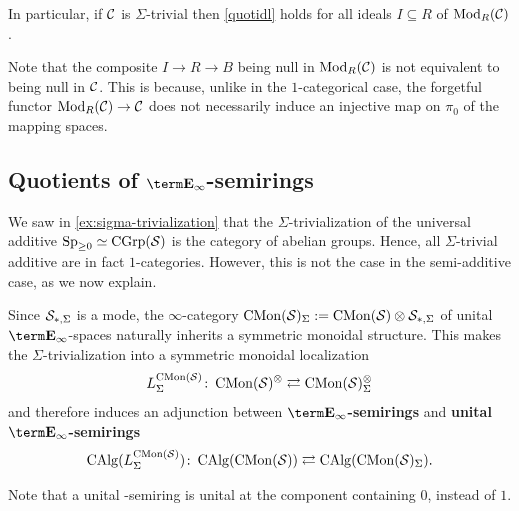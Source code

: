 \documentclass[10pt,a4paper,oneside]{article}
\begin{document}
\begin{rem}
In particular, if $\mathcal{C}$ is $\Sigma$-trivial then \cref{quotidl} holds for all ideals $I \subseteq R$ of $\operatorname{Mod}_{R}(\mathcal{C})$.
\end{rem}


\begin{rem}
Note that the composite $I\to R\to B$ being null in $\operatorname{Mod}_R(\mathcal{C})$ is not equivalent to being null in $\mathcal{C}$. This is because, unlike in the $1$-categorical case, the forgetful functor $\operatorname{Mod}_R(\mathcal{C})\to\mathcal{C}$ does not necessarily induce an injective map on $\pi_0$ of the mapping spaces.
\end{rem}

\subsection{Quotients of $\einf$-semirings}
We saw in \cref{ex:sigma-trivialization} that the $\Sigma$-trivialization of the universal additive \infcat  $\operatorname{Sp}_{\geq0}\simeq\operatorname{CGrp}(\mathcal{S})$ is the category of abelian groups. Hence, all $\Sigma$-trivial additive \infcats are in fact $1$-categories.
However, this is not the case in the semi-additive case, as we now explain. 

\begin{de}
Since $\mathcal{S}_{*,\Sigma}$ is a mode, the $\infty$-category $\operatorname{CMon}(\mathcal{S})_\Sigma:= \operatorname{CMon}(\mathcal{S})\otimes \mathcal{S}_{*,\Sigma}$ of unital $\einf$-spaces naturally inherits a symmetric monoidal structure. This makes the $\Sigma$-trivialization into a symmetric monoidal localization
$$L_\Sigma^{\operatorname{CMon}(\mathcal{S})}\colon\operatorname{CMon}(\mathcal{S})^\otimes\rightleftarrows\operatorname{CMon}(\mathcal{S})_\Sigma^\otimes$$
and therefore induces an adjunction between \textbf{$\einf$-semirings} and \textbf{unital $\einf$-semirings}
$$\operatorname{CAlg}(L_\Sigma^{\operatorname{CMon}(\mathcal{S})})\colon\operatorname{CAlg}(\operatorname{CMon}(\mathcal{S}))\rightleftarrows\operatorname{CAlg}(\operatorname{CMon}(\mathcal{S})_\Sigma).$$
\end{de}

\begin{rem}
Note that a unital \ein-semiring is unital at the component containing $0$, instead of $1$. 
\end{rem}

\end{document}
